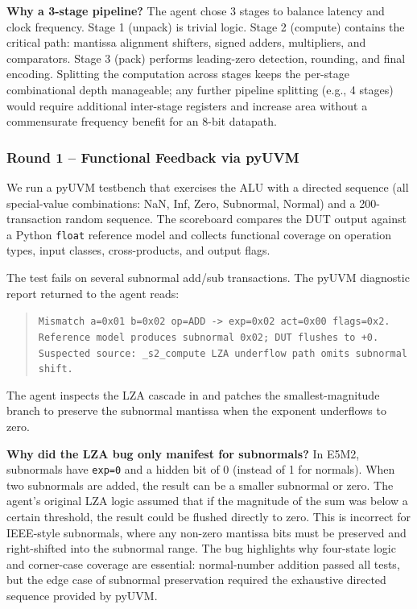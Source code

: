 \documentclass[11pt]{article}
\begin{document}
\textbf{Why a 3-stage pipeline?} The agent chose 3 stages to balance latency and clock frequency. Stage 1 (unpack) is trivial logic. Stage 2 (compute) contains the critical path: mantissa alignment shifters, signed adders, multipliers, and comparators. Stage 3 (pack) performs leading-zero detection, rounding, and final encoding. Splitting the computation across stages keeps the per-stage combinational depth manageable; any further pipeline splitting (e.g., 4 stages) would require additional inter-stage registers and increase area without a commensurate frequency benefit for an 8-bit datapath.

\subsubsection{Round 1 -- Functional Feedback via pyUVM}

We run a pyUVM testbench that exercises the ALU with a directed sequence (all special-value combinations: NaN, Inf, Zero, Subnormal, Normal) and a 200-transaction random sequence. The scoreboard compares the DUT output against a Python \texttt{float} reference model and collects functional coverage on operation types, input classes, cross-products, and output flags.

The test fails on several subnormal add/sub transactions. The pyUVM diagnostic report returned to the agent reads:

\begin{quote}
\small\texttt{Mismatch a=0x01 b=0x02 op=ADD -> exp=0x02 act=0x00 flags=0x2. \\ Reference model produces subnormal 0x02; DUT flushes to +0. \\ Suspected source: \_s2\_compute LZA underflow path omits subnormal shift.}
\end{quote}

The agent inspects the LZA cascade in  and patches the smallest-magnitude branch to preserve the subnormal mantissa when the exponent underflows to zero.

\textbf{Why did the LZA bug only manifest for subnormals?} In E5M2, subnormals have \texttt{exp=0} and a hidden bit of 0 (instead of 1 for normals). When two subnormals are added, the result can be a smaller subnormal or zero. The agent's original LZA logic assumed that if the magnitude of the sum was below a certain threshold, the result could be flushed directly to zero. This is incorrect for IEEE-style subnormals, where any non-zero mantissa bits must be preserved and right-shifted into the subnormal range. The bug highlights why four-state logic and corner-case coverage are essential: normal-number addition passed all tests, but the edge case of subnormal preservation required the exhaustive directed sequence provided by pyUVM.
\end{document}
